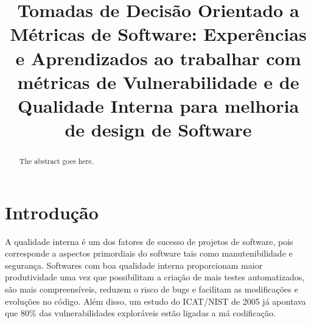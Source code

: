 \documentclass[conference]{IEEEtran}
\begin{document}
%
\title{Tomadas de Decisão Orientado a Métricas de Software: Experências e Aprendizados ao trabalhar com métricas de Vulnerabilidade e de Qualidade Interna para melhoria de design de Software}


\author{
\and
{}
}



\maketitle


\begin{abstract}
The abstract goes here.
\end{abstract}

\IEEEpeerreviewmaketitle



\section{Introdução}

A qualidade interna é um dos fatores de sucesso de projetos de software, pois corresponde a aspectos primordiais do software tais como manutenibilidade e segurança. Softwares com boa qualidade interna proporcionam maior produtividade uma vez que possibilitam a criação de mais testes automatizados, são mais compreensíveis, reduzem o risco de bugs e facilitam as modificações e evoluções no código. Além disso, um estudo do ICAT/NIST de 2005 já apontava que 80\% das vulnerabilidades exploráveis estão ligadas a má codificação.
\end{document}
